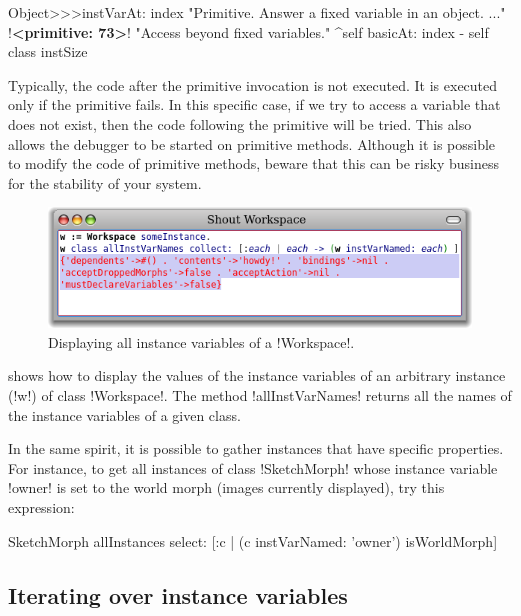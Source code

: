 \documentclass[a4paper,10pt,twoside]{book}
\begin{document}
\begin{code}{}
Object>>>instVarAt: index 
	"Primitive. Answer a fixed variable in an object. ..."
	!\textbf{<primitive: 73>}!
	"Access beyond fixed variables."
	^self basicAt: index - self class instSize		
\end{code}

Typically, the code after the primitive invocation is not executed.
It is executed only if the primitive fails. In this specific case, if we try to access a variable that does not exist, then the code following the primitive will be tried.
This also allows the debugger to be started on primitive methods.
Although it is possible to modify the code of primitive methods, beware that this can be risky business for the stability of your \pharo system.

\begin{figure}[ht]\centering
	\includegraphics[width=\linewidth]{allInstanceVariables}
	\caption{Displaying all instance variables of a \ct!Workspace!.}
\end{figure}

 shows how to display the values of the instance variables of an arbitrary instance (\ct!w!) of class \ct!Workspace!.
The method \ct!allInstVarNames! returns all the names of the instance variables of a given class.

In the same spirit, it is possible to gather instances that have specific properties.
For instance, to get all instances of class \ct!SketchMorph! whose instance variable \ct!owner! is set to the world morph (\ie images currently displayed), try this expression:
\begin{code}{}
SketchMorph allInstances select: [:c | (c instVarNamed: 'owner') isWorldMorph]
\end{code}

\subsection{Iterating over instance variables}
\end{document}
